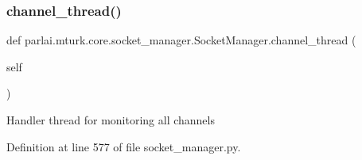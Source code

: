 \subsubsection{\texorpdfstring{channel\+\_\+thread()}{channel\_thread()}}
{\footnotesize\ttfamily def parlai.\+mturk.\+core.\+socket\+\_\+manager.\+Socket\+Manager.\+channel\+\_\+thread (\begin{DoxyParamCaption}\item[{}]{self }\end{DoxyParamCaption})}

\begin{DoxyVerb}Handler thread for monitoring all channels\end{DoxyVerb}
 

Definition at line 577 of file socket\+\_\+manager.\+py.



